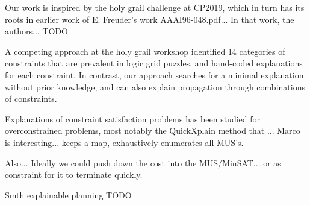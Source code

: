 Our work is inspired by the holy grail challenge at CP2019, which in turn has its roots in earlier work of E. Freuder's work \cite{}AAAI96-048.pdf... In that work, the authors... TODO

A competing approach at the holy grail workshop \cite{} identified 14 categories of constraints that are prevalent in logic grid puzzles, and hand-coded explanations for each constraint. In contrast, our approach searches for a minimal explanation without prior knowledge, and can also explain propagation through combinations of constraints.

Explanations of constraint satisfaction problems has been studied for overconstrained problems, most notably the QuickXplain method \cite{} that ...
Marco is interesting... keeps a map, exhaustively enumerates all MUS's.

Also...  Ideally we could push down the cost into the MUS/MinSAT... or as constraint for it to terminate quickly.

Smth explainable planning TODO